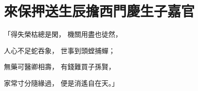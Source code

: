 %

\chapter{來保押送生辰擔\KG 西門慶生子嘉官}


\begin{showcontents}{}



「得失榮枯總是閑，  機關用盡也徒然，

人心不足蛇吞象，  世事到頭螳捕蟬；

無藥可醫卿相壽，  有錢難買子孫賢，

家常寸分隨緣過，  便是消遙自在天。」


\end{showcontents}
